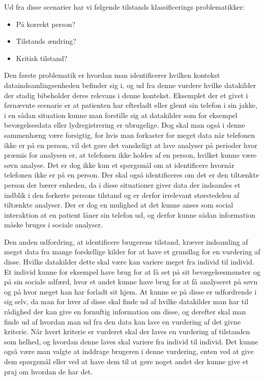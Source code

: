Ud fra disse scenarier har vi følgende tilstands klassificerings problematikker:
\begin{itemize}
\item På korrekt person?
\item Tilstands ændring?
\item Kritisk tilstand?
\end{itemize}

Den første problematik er hvordan man identificerer hvilken kontekst dataindsamlingsenheden befinder sig i, og ud fra denne vurdere hvilke datakilder der stadig bibeholder deres relevans i denne kontekst.
Eksemplet der et givet i førnævnte scenarie er at patienten har efterladt eller glemt sin telefon i sin jakke, i en sådan situation kunne man forstille sig at datakilder som for eksempel bevægelsesdata eller lydregistrering er ubrugelige.
Dog skal man også i denne sammenhæng være forsigtig, for hvis man forkaster for meget data når telefonen ikke er på en person, vil det gøre det vanskeligt at lave analyser på perioder hvor præmis for analysen er, at telefonen ikke holdes af en person, hvilket kunne være søvn analyse. 
Det er dog ikke kun et spørgsmål om at identificere hvornår telefonen ikke er på en person.
Der skal også identificeres om det er den tiltænkte person der bærer enheden, da i disse situationer giver data der indsamles et indblik i den forkerte persons tilstand og er derfor irrelevant størstedelen af tiltænkte analyser.
Der er dog en mulighed at det kunne anses som social interaktion at en patient låner sin telefon ud, og derfor kunne sådan information måske bruges i sociale analyser.

Den anden udfordring, at identificere brugerens tilstand, kræver indsamling af meget data fra mange forskellige kilder for at have et grundlag for en vurdering af disse.
Hvilke datakilder dette skal være kan variere meget fra individ til individ.
Et individ kunne for eksempel have brug for at få set på sit bevægelsesmønster og på sin sociale adfærd, hvor et andet kunne have brug for at få analyseret på søvn og på hvor meget han har forladt sit hjem.
At kunne se på disse er udfordrende i sig selv, da man for hver af disse skal finde ud af hvilke datakilder man har til rådighed der kan give en fornuftig information om disse, og derefter skal man finde ud af hvordan man ud fra den data kan lave en vurdering af det givne kriterie.
Når hvert kriterie er vurderet skal der laves en vurdering af tilstanden som helhed, og hvordan denne laves skal variere fra individ til individ.
Det kunne også være man valgte at inddrage brugeren i denne vurdering, enten ved at give dem spørgsmål eller ved at have dem til at gøre noget andet der kunne give et praj om hvordan de har det.

